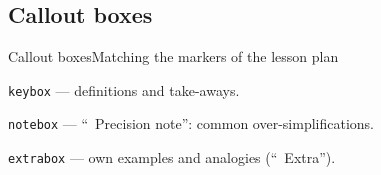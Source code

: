 \subsection{Callout boxes}
\begin{frame}{Callout boxes}{Matching the markers of the lesson plan}
  \begin{keybox}
    \texttt{keybox} --- definitions and take-aways.
  \end{keybox}
  \begin{notebox}
    \texttt{notebox} --- ``\faExclamationTriangle\ Precision note'': common over-simplifications.
  \end{notebox}
  \begin{extrabox}
    \texttt{extrabox} --- own examples and analogies (``\faPuzzlePiece\ Extra'').
  \end{extrabox}
\end{frame}
